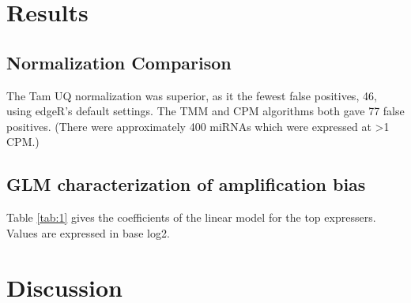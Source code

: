 \documentclass{bioinfo}
\begin{document}
\section{Results}
\subsection{Normalization Comparison}
The Tam UQ normalization was superior, as it the fewest false positives, 46, using edgeR's default settings. The TMM and CPM algorithms both gave 77 false positives. (There were approximately 400 miRNAs which were expressed at >1 CPM.) 

\subsection{GLM characterization of amplification bias}
Table \ref{tab:1} gives the coefficients of the linear model for the top expressers. Values are expressed in base log2.


\section{Discussion}
\end{document}
